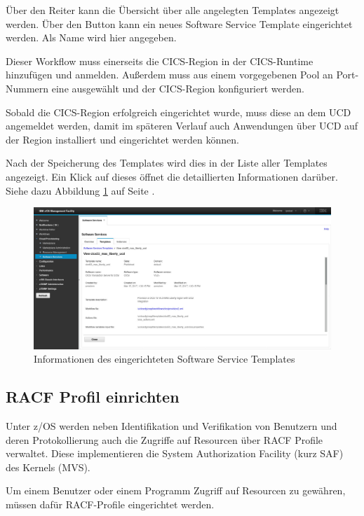 Über den Reiter  kann die Übersicht über alle angelegten Templates angezeigt werden. Über den Button
 kann ein neues Software Service Template eingerichtet werden. Als Name wird hier
 angegeben.

Dieser Workflow muss einerseits die CICS-Region in der CICS-Runtime hinzufügen und anmelden. Außerdem muss aus einem
vorgegebenen Pool an Port-Nummern eine ausgewählt und der CICS-Region konfiguriert werden.

Sobald die CICS-Region erfolgreich eingerichtet wurde, muss diese an dem UCD angemeldet werden, damit im späteren
Verlauf auch Anwendungen über UCD auf der Region installiert und eingerichtet werden können.

Nach der Speicherung des Templates wird dies in der Liste aller Templates angezeigt. Ein Klick auf dieses öffnet die
detaillierten Informationen darüber. Siehe dazu Abbildung \ref{fig:zosmftemplate} auf Seite \pageref{fig:zosmftemplate}.

\begin{figure}[h]
  \centering
    \includegraphics[scale=0.32]{images/kapitel_3/zosmf_template.pdf}
  \caption{Informationen des eingerichteten Software Service Templates}
  \label{fig:zosmftemplate}
\end{figure}

\subsection{RACF Profil einrichten}
Unter z/OS werden neben Identifikation und Verifikation von Benutzern und deren Protokollierung auch die Zugriffe
auf Resourcen über RACF Profile verwaltet. Diese implementieren die System Authorization Facility (kurz SAF) des Kernels
(MVS).

Um einem Benutzer oder einem Programm Zugriff auf Resourcen zu gewähren, müssen dafür RACF-Profile eingerichtet werden.

